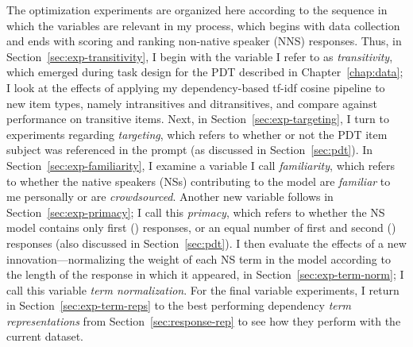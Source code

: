 The optimization experiments are organized here according to the sequence in which the variables are relevant in my process, which begins with data collection and ends with scoring and ranking non-native speaker (NNS) responses. Thus, in Section~\ref{sec:exp-transitivity}, I begin with the variable I refer to as \textit{transitivity}, which emerged during task design for the PDT described in Chapter~\ref{chap:data}; I look at the effects of applying my dependency-based tf-idf cosine pipeline to new item types, namely intransitives and ditransitives, and compare against performance on transitive items. Next, in Section~\ref{sec:exp-targeting}, I turn to experiments regarding \textit{targeting}, which refers to whether or not the PDT item subject was referenced in the prompt (as discussed in Section~\ref{sec:pdt}). In Section~\ref{sec:exp-familiarity}, I examine a variable I call \textit{familiarity}, which refers to whether the native speakers (NSs) contributing to the model are \textit{familiar} to me personally or are \textit{crowdsourced}. Another new variable follows in Section~\ref{sec:exp-primacy}; I call this \textit{primacy}, which refers to whether the NS model contains only first () responses, or an equal number of first and second () responses (also discussed in Section~\ref{sec:pdt}). I then evaluate the effects of a new innovation---normalizing the weight of each NS term in the model according to the length of the response in which it appeared, in Section~\ref{sec:exp-term-norm}; I call this variable \textit{term normalization}. For the final variable experiments, I return in Section~\ref{sec:exp-term-reps} to the best performing dependency \textit{term representations} from Section~\ref{sec:response-rep} to see how they perform with the current dataset.



